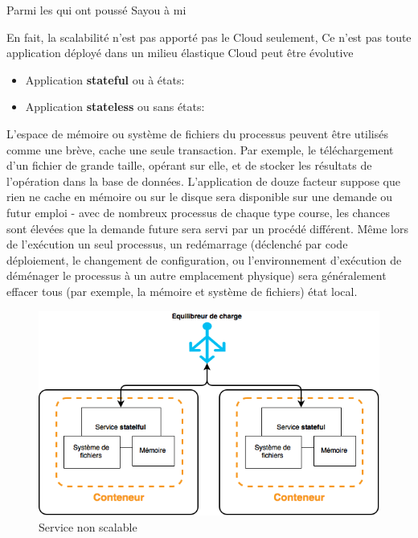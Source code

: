 \begin{onehalfspace}
Parmi les  qui ont poussé Sayou à mi

En fait, la scalabilité n'est pas apporté pas le Cloud seulement,  Ce n'est pas toute application déployé dans un milieu élastique Cloud peut être évolutive

\begin{itemize}
	\item Application \textbf{stateful} ou à états: 
	\item Application \textbf{stateless} ou sans états: 
\end{itemize}

L'espace de mémoire ou système de fichiers du processus peuvent être utilisés comme une brève, cache une seule transaction. Par exemple, le téléchargement d'un fichier de grande taille, opérant sur elle, et de stocker les résultats de l'opération dans la base de données. L'application de douze facteur suppose que rien ne cache en mémoire ou sur le disque sera disponible sur une demande ou futur emploi - avec de nombreux processus de chaque type course, les chances sont élevées que la demande future sera servi par un procédé différent. Même lors de l'exécution un seul processus, un redémarrage (déclenché par code déploiement, le changement de configuration, ou l'environnement d'exécution de déménager le processus à un autre emplacement physique) sera généralement effacer tous (par exemple, la mémoire et système de fichiers) état local.

\begin{figure}[H]
\centering
\includegraphics [scale=0.5]{chapitre4/assets/stateful}
\caption{Service non scalable}
\label{fig:}
\end{figure}


\end{onehalfspace}
